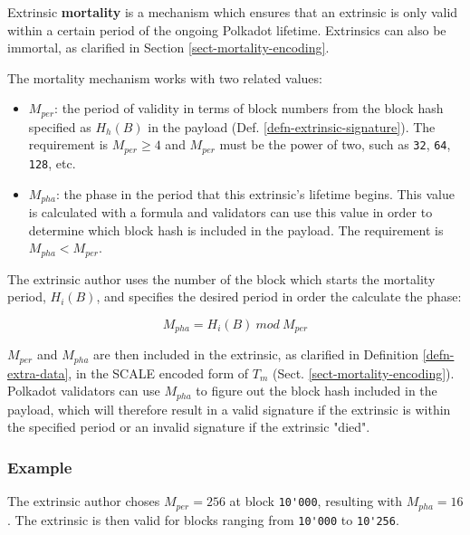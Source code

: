 \begin{definition}
    \label{defn-extrinsic-mortality}
    Extrinsic \textbf{mortality} is a mechanism which ensures that an extrinsic
    is only valid within a certain period of the ongoing Polkadot lifetime.
    Extrinsics can also be immortal, as clarified in Section
    \ref{sect-mortality-encoding}.
    \newline

    The mortality mechanism works with two related values:

    \begin{itemize}
        \item $M_{per}$: the period of validity in terms of block numbers from
        the block hash specified as $H_h(B)$ in the payload (Def.
        \ref{defn-extrinsic-signature}). The requirement is $M_{per} \geq 4$ and
        $M_{per}$ must be the power of two, such as \verb|32|, \verb|64|,
        \verb|128|, etc.
        \item $M_{pha}$: the phase in the period that this extrinsic's lifetime
        begins. This value is calculated with a formula and validators can use
        this value in order to determine which block hash is included in the
        payload. The requirement is $M_{pha} < M_{per}$.
    \end{itemize}

    The extrinsic author uses the number of the block which starts the mortality
    period, $H_i(B)$, and specifies the desired period in order the calculate
    the phase:

    \[
        M_{pha} = H_i(B)\ mod\ M_{per}
    \]

    $M_{per}$ and $M_{pha}$ are then included in the extrinsic, as clarified in
    Definition \ref{defn-extra-data}, in the SCALE encoded form of $T_m$ (Sect.
    \ref{sect-mortality-encoding}). Polkadot validators can use $M_{pha}$
    to figure out the block hash included in the payload, which will therefore
    result in a valid signature if the extrinsic is within the specified period 
    or an invalid signature if the extrinsic "died".

    \subsubsection*{Example}

    The extrinsic author choses $M_{per} = 256$ at block \verb|10'000|,
    resulting with $M_{pha} = 16$. The extrinsic is then valid for blocks
    ranging from \verb|10'000| to \verb|10'256|.


\end{definition}
